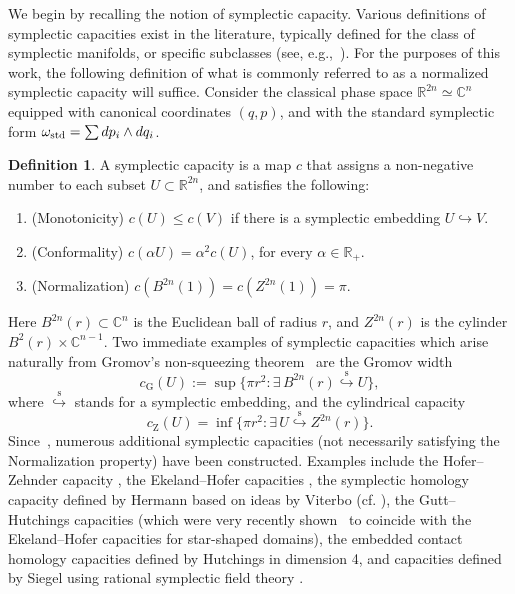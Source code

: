 \documentclass[10pt,a4paper]{article}
\theoremstyle{definition}
\newtheorem{definition}[theorem]{Definition}
\newcommand{\R}{{\mathbb{R}}}
\newcommand{\C}{{\mathbb{C}}}
\begin{document}
We begin by recalling the notion of symplectic capacity. Various definitions of symplectic capacities exist in the literature, typically defined for the class of symplectic manifolds, or specific subclasses (see, e.g.,~\cite{capacity_survey_1}).
For the purposes of this work, the following definition of what is commonly referred to as a normalized symplectic capacity will suffice.
Consider the classical phase space $\R^{2n} \simeq \C^n$ equipped with canonical  coordinates $(q,p)$, and with the standard symplectic form $\omega_{\rm std} = \sum dp_i \wedge dq_i$.
\begin{definition}
A symplectic capacity is a map $c$ that assigns a non-negative number 
to each subset $U \subset \R^{2n}$, and satisfies the following:
\begin{enumerate}
\item (Monotonicity) $c(U) \leq c(V)$ if there is a symplectic embedding $U \hookrightarrow V$.
\item (Conformality) $c( \alpha U) = \alpha^2 c(U)$, for every $\alpha \in \R_{+}$.
\item (Normalization) $c(B^{2n}(1)) = c(Z^{2n}(1)) = \pi$.
\end{enumerate}
\end{definition}
Here $B^{2n}(r) \subset \C^n$ is the Euclidean ball of radius $r$, and $Z^{2n}(r)$ is the cylinder $B^2(r) \times \C^{n-1}$. 
Two immediate examples of symplectic capacities which arise naturally from Gromov's non-squeezing theorem~\cite{gromov} are the Gromov width 
$$c_{\mathrm{G}}(U) := \sup \{ \pi r^2 : \exists \,  B^{2n}(r) \overset{\mathrm s}{\hookrightarrow } U  \},$$
where $\overset{\mathrm s}{\hookrightarrow }$ stands for a symplectic embedding, and the cylindrical capacity
$$ c_{\mathrm{Z}}(U) = \inf \{ \pi r^2 : \exists \, U  \overset{\mathrm s}{\hookrightarrow } Z^{2n}(r)  \}.$$
Since~\cite{gromov}, numerous additional symplectic capacities (not necessarily satisfying the Normalization property) have been constructed. 
Examples include the Hofer--Zehnder capacity \cite{hofer-zehnder}, the Ekeland--Hofer capacities \cite{hofer-ekeland}, the symplectic homology capacity defined by Hermann \cite{hermann2000} based on ideas by Viterbo \cite{viterbo-sh} (cf. \cite{FHW94}), the Gutt--Hutchings capacities \cite{Gu-Ha} (which were very recently shown~\cite{GuttRamos} to coincide with the Ekeland--Hofer capacities for star-shaped domains), the embedded contact homology capacities \cite{ech} defined by Hutchings in dimension 4, and capacities defined by Siegel using rational symplectic field theory \cite{siegel}.
\end{document}
